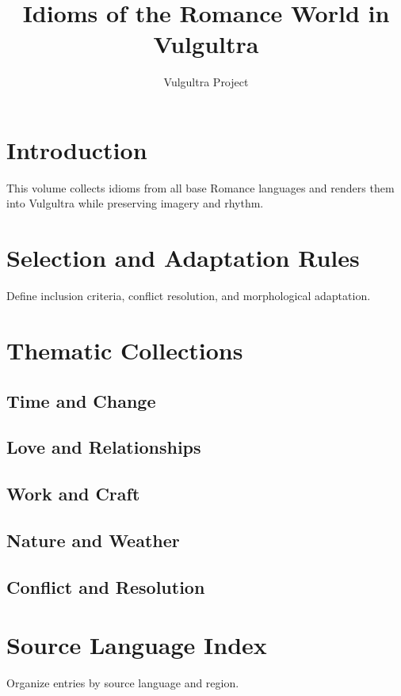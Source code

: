 \documentclass[12pt]{book}
\title{Idioms of the Romance World in Vulgultra}
\author{Vulgultra Project}
\date{}
\begin{document}
\maketitle
\tableofcontents

\chapter{Introduction}
This volume collects idioms from all base Romance languages and renders them
into Vulgultra while preserving imagery and rhythm.

\chapter{Selection and Adaptation Rules}
Define inclusion criteria, conflict resolution, and morphological adaptation.

\chapter{Thematic Collections}
\section{Time and Change}
\section{Love and Relationships}
\section{Work and Craft}
\section{Nature and Weather}
\section{Conflict and Resolution}

\chapter{Source Language Index}
Organize entries by source language and region.
\end{document}

